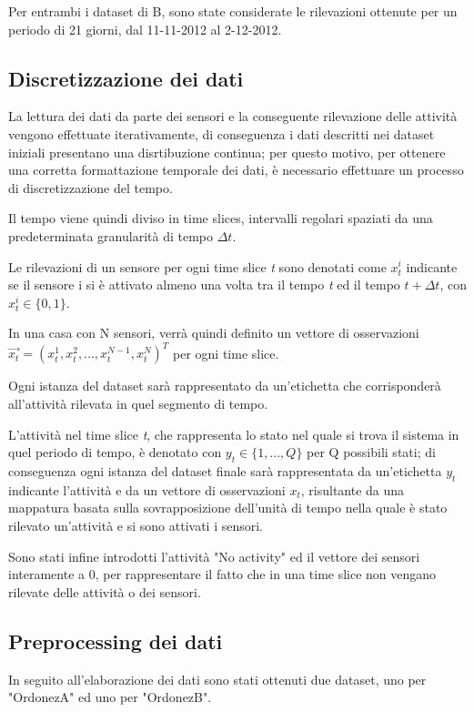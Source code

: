 \documentclass[10pt,a4paper]{article}
\begin{document}
	Per entrambi i dataset di B, sono state considerate le rilevazioni ottenute per un periodo di 21 giorni, dal 11-11-2012 al 2-12-2012.
	
	\subsection{Discretizzazione dei dati}
	La lettura dei dati da parte dei sensori e la conseguente rilevazione delle attività vengono effettuate iterativamente, di conseguenza i dati descritti nei dataset iniziali presentano una disrtibuzione continua; per questo motivo, per ottenere una corretta formattazione temporale dei dati, è necessario effettuare un processo di discretizzazione del tempo.
	
	Il tempo viene quindi diviso in time slices, intervalli regolari spaziati da una predeterminata granularità di tempo $ \Delta t $.
	
	Le rilevazioni di un sensore per ogni time slice \textit{t} sono denotati come $ x^{i}_{t} $ indicante se il sensore i si è attivato almeno una volta tra il tempo \textit{t} ed il tempo $ t + \Delta t $, con $ x^{i}_{t}  \in  \{0, 1\} $. 
	
	In una casa con N sensori, verrà quindi definito un vettore di osservazioni $ \vec{x_{t}}  = (x^{1}_{t} , x^{2}_{t} , . . . , x^{N-1}_{t} , x^{N}_{t} )^{T} $   per ogni time slice.
	
	Ogni istanza del dataset sarà rappresentato da un'etichetta che corrisponderà all'attività rilevata in quel segmento di tempo.
	
	L'attività nel time slice \textit{t}, che rappresenta lo stato nel quale si trova il sistema in quel periodo di tempo, è denotato con $ y_{t}  \in  \{1, . . . , Q\} $ per Q possibili stati; di conseguenza ogni istanza del dataset finale sarà rappresentata da un'etichetta $ y_{t} $ indicante l'attività e da un vettore di osservazioni $ x_{t} $, risultante da una mappatura basata sulla sovrapposizione dell'unità di tempo nella quale è stato rilevato un'attività e si sono attivati i sensori.
	
	Sono stati infine introdotti l'attività "No activity" ed il vettore dei sensori interamente a 0, per rappresentare il fatto che in una time slice non vengano rilevate delle attività o dei sensori.
	
	\subsection{Preprocessing dei dati}
	In seguito all'elaborazione dei dati sono stati ottenuti due dataset, uno per "OrdonezA" ed uno per "OrdonezB".
\end{document}
